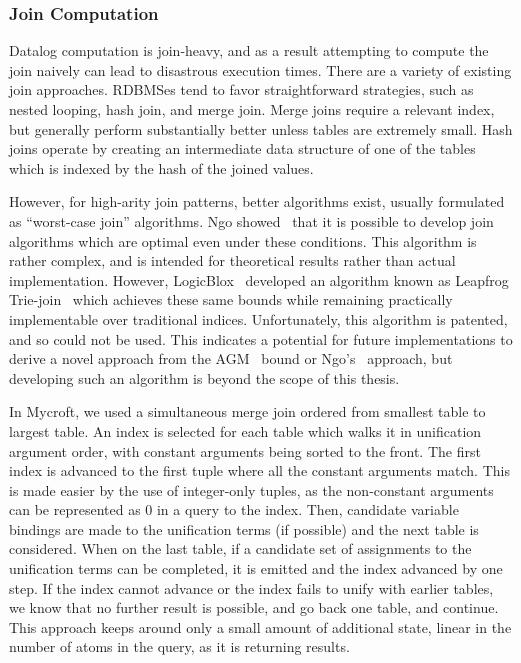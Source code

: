 \subsubsection{Join Computation}
\label{holmes:sec:join}
Datalog computation is join-heavy, and as a result attempting to compute the join naively can lead to disastrous execution times.
There are a variety of existing join approaches.
RDBMSes tend to favor straightforward strategies, such as nested looping, hash join, and merge join.
Merge joins require a relevant index, but generally perform substantially better unless tables are extremely small.
Hash joins operate by creating an intermediate data structure of one of the tables which is indexed by the hash of the joined values.

However, for high-arity join patterns, better algorithms exist, usually formulated as ``worst-case join'' algorithms.
Ngo showed~\cite{nprr} that it is possible to develop join algorithms which are optimal even under these conditions.
This algorithm is rather complex, and is intended for theoretical results rather than actual implementation.
However, LogicBlox~\cite{logicblox} developed an algorithm known as Leapfrog Trie-join~\cite{lftj} which achieves these same bounds while remaining practically implementable over traditional indices.
Unfortunately, this algorithm is patented, and so could not be used.
This indicates a potential for future implementations to derive a novel approach from the AGM~\cite{agm} bound or Ngo's~\cite{nprr} approach, but developing such an algorithm is beyond the scope of this thesis.

In Mycroft, we used a simultaneous merge join ordered from smallest table to largest table.
An index is selected for each table which walks it in unification argument order, with constant arguments being sorted to the front.
The first index is advanced to the first tuple where all the constant arguments match.
This is made easier by the use of integer-only tuples, as the non-constant arguments can be represented as 0 in a query to the index.
Then, candidate variable bindings are made to the unification terms (if possible) and the next table is considered.
When on the last table, if a candidate set of assignments to the unification terms can be completed, it is emitted and the index advanced by one step.
If the index cannot advance or the index fails to unify with earlier tables, we know that no further result is possible, and go back one table, and continue.
This approach keeps around only a small amount of additional state, linear in the number of atoms in the query, as it is returning results.

